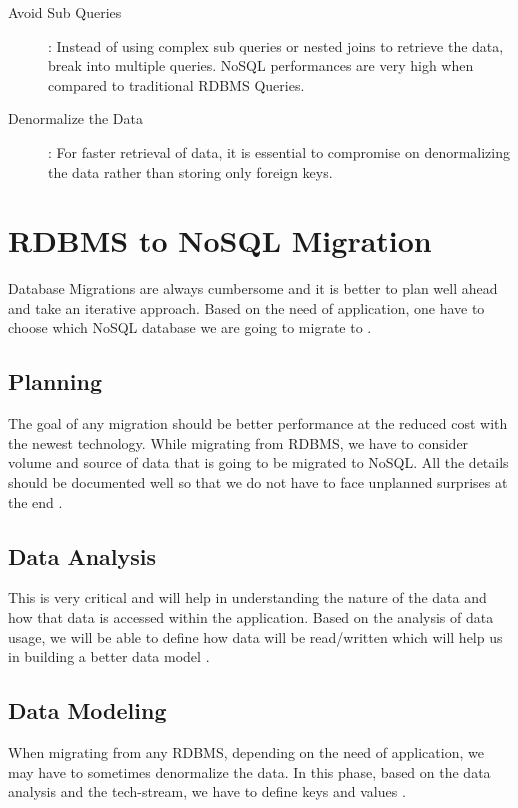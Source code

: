 \documentclass[sigconf]{acmart}
\begin{document}
\begin{description}
    \item[Avoid Sub Queries]: Instead of using complex sub queries or nested joins to retrieve the data, break into multiple queries. NoSQL performances are very high when compared to traditional RDBMS Queries.
    \item[Denormalize the Data]: For faster retrieval of data, it is essential to compromise on denormalizing the data rather than storing only foreign keys.
    
\end{description}

\section{RDBMS to NoSQL Migration}

Database Migrations are always cumbersome and it is better to plan well ahead and take an iterative approach. Based on the need of application, one have to choose which NoSQL database we are going to migrate to \cite{aws}.

\subsection{Planning}  

The goal of any migration should be better performance at the reduced cost with the newest technology. While migrating from RDBMS, we have to consider volume and source of data that is going to be migrated to NoSQL. All the details should be documented well so that we do not have to face unplanned surprises at the end \cite{mongrdbms}.

\subsection{Data Analysis} 

This is very critical and will help in understanding the nature of the data and how that data is accessed within the application. Based on the analysis of data usage, we will be able to define how data will be read/written which will help us in building a better data model \cite{mongrdbms}.

\subsection{Data Modeling} 

When migrating from any RDBMS, depending on the need of application, we may have to sometimes denormalize the data. In this phase, based on the data analysis and the tech-stream, we have to define keys and values \cite{aws}.
\end{document}
